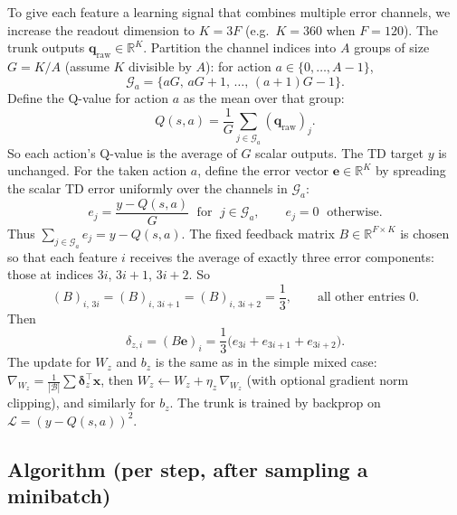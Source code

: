 \documentclass[11pt]{article}
\begin{document}
To give each feature a learning signal that combines multiple error channels, we increase the readout dimension to $K = 3F$ (e.g.\ $K=360$ when $F=120$). The trunk outputs $\mathbf{q}_{\mathrm{raw}} \in \mathbb{R}^K$. Partition the channel indices into $A$ groups of size $G = K/A$ (assume $K$ divisible by $A$): for action $a \in \{0,\ldots,A-1\}$,
\begin{equation}
\mathcal{G}_a = \bigl\{ aG,\, aG+1,\, \ldots,\, (a+1)G - 1 \bigr\}.
\end{equation}
Define the Q-value for action $a$ as the mean over that group:
\begin{equation}
Q(s,a) = \frac{1}{G} \sum_{j \in \mathcal{G}_a} (\mathbf{q}_{\mathrm{raw}})_j.
\end{equation}
So each action's Q-value is the average of $G$ scalar outputs. The TD target $y$ is unchanged. For the taken action $a$, define the error vector $\mathbf{e} \in \mathbb{R}^K$ by spreading the scalar TD error uniformly over the channels in $\mathcal{G}_a$:
\begin{equation}
e_j = \frac{y - Q(s,a)}{G} \;\text{ for }\; j \in \mathcal{G}_a, \qquad e_j = 0 \;\text{ otherwise}.
\end{equation}
Thus $\sum_{j \in \mathcal{G}_a} e_j = y - Q(s,a)$. The fixed feedback matrix $B \in \mathbb{R}^{F \times K}$ is chosen so that each feature $i$ receives the average of exactly three error components: those at indices $3i$, $3i+1$, $3i+2$. So
\begin{equation}
(B)_{i,\, 3i} = (B)_{i,\, 3i+1} = (B)_{i,\, 3i+2} = \frac{1}{3}, \qquad \text{all other entries } 0.
\end{equation}
Then
\begin{equation}
\delta_{z,i} = (B\mathbf{e})_i = \frac{1}{3}\bigl( e_{3i} + e_{3i+1} + e_{3i+2} \bigr).
\end{equation}
The update for $W_z$ and $b_z$ is the same as in the simple mixed case: $\nabla_{W_z} = \frac{1}{|\mathcal{B}|} \sum \boldsymbol{\delta}_z^{\top} \mathbf{x}$, then $W_z \leftarrow W_z + \eta_z\,\nabla_{W_z}$ (with optional gradient norm clipping), and similarly for $b_z$. The trunk is trained by backprop on $\mathcal{L} = (y - Q(s,a))^2$.

\subsection{Algorithm (per step, after sampling a minibatch)}
\end{document}
